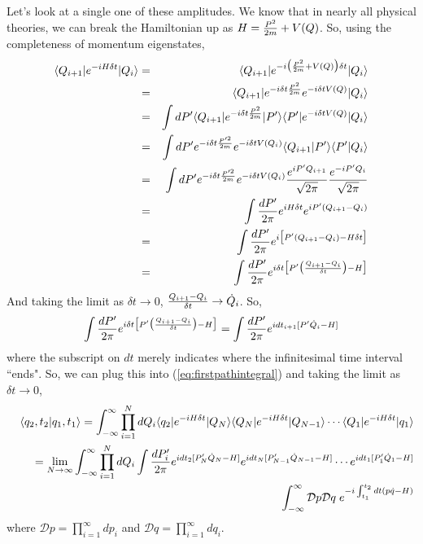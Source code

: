 \documentclass[12pt,epsf]{article}
\def\nolabel{\nonumber }
\def\nolabel{\nonumber }
\begin{document}
Let's look at a single one of these amplitudes.  We know that in nearly
all physical theories, we can break the Hamiltonian up as $H = {P^2
\over 2m} + V(Q)$.  So, using the completeness of momentum eigenstates, 
\begin{eqnarray}
\langle Q_{i+1}|e^{-iH\delta t}|Q_i\rangle &=& \langle Q_{i+1} |
e^{-i\big({P^2 \over 2m}+ V(Q)\big)\delta t}|Q_i\rangle \nolabel \\
&=& \langle Q_{i+1}|e^{-i\delta t {P^2 \over 2m}}e^{-i\delta t
V(Q)}|Q_i\rangle \nolabel \\
&=& \int dP' \langle Q_{i+1}|e^{-i\delta t{P^2 \over 2m}}|P'\rangle
\langle P'|e^{-i\delta t V(Q)}|Q_i\rangle \nolabel \\
&=& \int dP' e^{-i\delta t {P'^2 \over 2m}}e^{-i\delta t V(Q_i)}\langle
Q_{i+1}|P'\rangle \langle P'|Q_i\rangle \nolabel \\
&=&  \int dP' e^{-i\delta t {P'^2 \over 2m}} e^{-i\delta t V(Q_i)}
{e^{iP' Q_{i+1}} \over \sqrt{2\pi}} {e^{-iP' Q_i} \over \sqrt{2\pi}}
\nolabel \\
&=& \int {dP' \over 2\pi} e^{iH\delta t}e^{iP'(Q_{i+1} - Q_i)} \nolabel
\\
&=& \int {dP' \over 2\pi} e^{i\big[ P' (Q_{i+1} - Q_i) - H \delta
t\big]} \nolabel \\
&=& \int {dP' \over 2\pi} e^{i\delta t\big[ P' \big({Q_{i+1} - Q_i
\over \delta t}\big) - H \big]}\nolabel
\end{eqnarray}
And taking the limit as $\delta t \rightarrow 0$, ${Q_{i+1} - Q_i \over
\delta t} \rightarrow \dot{Q}_i$.  So, 
\begin{eqnarray}
\int {dP' \over 2\pi} e^{i\delta t\big[ P' \big({Q_{i+1} - Q_i \over
\delta t}\big) - H \big]} = \int {dP' \over 2\pi} e^{i dt_{i+1}
[P'\dot{Q}_i - H]}\nolabel
\end{eqnarray}
where the subscript on $dt$ merely indicates where the infinitesimal
time interval ``ends".	So, we can plug this into
(\ref{eq:firstpathintegral}) and taking the limit as $\delta t
\rightarrow 0$, 
\begin{eqnarray}
& & \langle q_2,t_2|q_1,t_1\rangle = \int_{-\infty}^{\infty}
\prod_{i=1}^NdQ_i\langle q_2|e^{-iH\delta t}|Q_N\rangle \langle
Q_N|e^{-iH\delta t}|Q_{N-1}\rangle \cdots \langle Q_1|e^{-iH\delta
t}|q_1\rangle \nolabel \\
& & \quad = \lim_{N\rightarrow \infty}
\int_{-\infty}^{\infty}\prod_{i=1}^N dQ_i \int {dP'_i \over 2\pi} e^{i
dt_2[P'_N\dot{Q}_N - H ]} e^{idt_N[P'_{N-1}\dot{Q}_{N-1} - H ]} \cdots
e^{idt_1[P'_1 \dot{Q}_1 - H ]} \nolabel \\
& & \quad \int_{-\infty}^{\infty} \mathcal{D} p \mathcal{D}q\;
e^{-i\int_{t_1}^{t_2} dt(p\dot{q} - H)}\nolabel
\end{eqnarray}
where $\mathcal{D}p = \prod_{i=1}^{\infty} dp_i$ and $\mathcal{D}q =
\prod_{i=1}^{\infty}dq_i$.  
\end{document}
